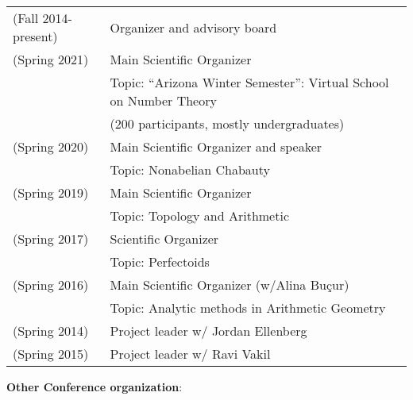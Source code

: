 \documentclass[margin,line]{res}
\newcommand{\defi}[1]{\textsf{#1}} 				%
\begin{document}
\begin{resume}
\begin{tabular}{ll}
  (Fall 2014-present) & Organizer and advisory board   \\
  (Spring 2021) & Main Scientific Organizer  \\
                     &Topic:  \defi{``Arizona Winter Semester'': Virtual School on Number Theory}\\
                        &(200 participants, mostly undergraduates) \\
  (Spring 2020) & Main Scientific Organizer and speaker \\
  &Topic:  \defi{Nonabelian Chabauty} \\
  (Spring 2019) & Main Scientific Organizer \\
  & Topic: \defi{Topology and Arithmetic} \\
  (Spring 2017) & Scientific Organizer \\
&   Topic: Perfectoids \\
  (Spring 2016) & Main Scientific Organizer (w/Alina Bu\c cur)\\
  &  Topic:     \defi{Analytic methods in Arithmetic Geometry}\\
 (Spring 2014) & Project leader w/ \defi{Jordan Ellenberg}  \\
 (Spring 2015) & Project leader w/ \defi{Ravi Vakil}  \\
\end{tabular}


  \textbf{Other Conference organization}:
  \vspace*{-.15in}
  

\end{resume}
\end{document}
